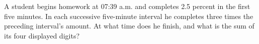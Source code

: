 A student begins homework at 07:39 a.m. and completes 2.5 percent in the first five minutes. In each successive five-minute interval he completes three times the preceding interval's amount. At what time does he finish, and what is the sum of its four displayed digits?
